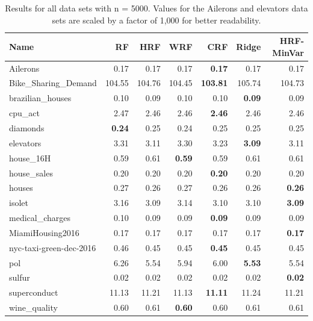 \begin{table}[ht]
\centering
\begingroup\scriptsize
\begin{tabular}{lrrrrrr}
  \hline
\textbf{ Name } & \textbf{ RF } & \textbf{ HRF } & \textbf{ WRF } & \textbf{ CRF } & \textbf{ Ridge } & \textbf{ HRF-MinVar } \\ 
  \hline
Ailerons & 0.17 & 0.17 & 0.17 & \textbf{0.17} & 0.17 & 0.17 \\ 
  Bike\_Sharing\_Demand & 104.55 & 104.76 & 104.45 & \textbf{103.81} & 105.74 & 104.73 \\ 
  brazilian\_houses & 0.10 & 0.09 & 0.10 & 0.10 & \textbf{0.09} & 0.09 \\ 
  cpu\_act & 2.47 & 2.46 & 2.46 & \textbf{2.46} & 2.46 & 2.46 \\ 
  diamonds & \textbf{0.24} & 0.25 & 0.24 & 0.25 & 0.25 & 0.25 \\ 
  elevators & 3.31 & 3.11 & 3.30 & 3.23 & \textbf{3.09} & 3.11 \\ 
  house\_16H & 0.59 & 0.61 & \textbf{0.59} & 0.59 & 0.61 & 0.61 \\ 
  house\_sales & 0.20 & 0.20 & 0.20 & \textbf{0.20} & 0.20 & 0.20 \\ 
  houses & 0.27 & 0.26 & 0.27 & 0.26 & 0.26 & \textbf{0.26} \\ 
  isolet & 3.16 & 3.09 & 3.14 & 3.10 & 3.10 & \textbf{3.09} \\ 
  medical\_charges & 0.10 & 0.09 & 0.09 & \textbf{0.09} & 0.09 & 0.09 \\ 
  MiamiHousing2016 & 0.17 & 0.17 & 0.17 & 0.17 & 0.17 & \textbf{0.17} \\ 
  nyc-taxi-green-dec-2016 & 0.46 & 0.45 & 0.45 & \textbf{0.45} & 0.45 & 0.45 \\ 
  pol & 6.26 & 5.54 & 5.94 & 6.00 & \textbf{5.53} & 5.54 \\ 
  sulfur & 0.02 & 0.02 & 0.02 & 0.02 & 0.02 & \textbf{0.02} \\ 
  superconduct & 11.13 & 11.21 & 11.13 & \textbf{11.11} & 11.24 & 11.21 \\ 
  wine\_quality & 0.60 & 0.61 & \textbf{0.60} & 0.60 & 0.61 & 0.61 \\ 
   \hline
\end{tabular}
\endgroup
\caption{Results for all data sets with n = 5000. Values for the Ailerons and elevators data sets are scaled by a factor of 1,000 for better readability.} 
\end{table}

